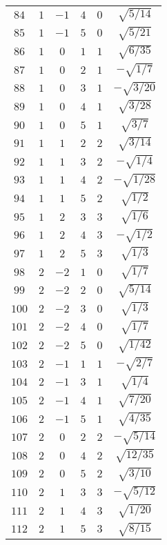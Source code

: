 \begin{table}
\begin{center}
\begin{tabular}{|c|c|c|c|c|c|}
$84$ & $1$ & $-1$ & $4$ & $0$ & $\sqrt{5/14}$ \\ 
$85$ & $1$ & $-1$ & $5$ & $0$ & $\sqrt{5/21}$ \\ 
$86$ & $1$ & $0$ & $1$ & $1$ & $\sqrt{6/35}$ \\ 
$87$ & $1$ & $0$ & $2$ & $1$ & $-\sqrt{1/7}$ \\ 
$88$ & $1$ & $0$ & $3$ & $1$ & $-\sqrt{3/20}$ \\ 
$89$ & $1$ & $0$ & $4$ & $1$ & $\sqrt{3/28}$ \\ 
$90$ & $1$ & $0$ & $5$ & $1$ & $\sqrt{3/7}$ \\ 
$91$ & $1$ & $1$ & $2$ & $2$ & $\sqrt{3/14}$ \\ 
$92$ & $1$ & $1$ & $3$ & $2$ & $-\sqrt{1/4}$ \\ 
$93$ & $1$ & $1$ & $4$ & $2$ & $-\sqrt{1/28}$ \\ 
$94$ & $1$ & $1$ & $5$ & $2$ & $\sqrt{1/2}$ \\ 
$95$ & $1$ & $2$ & $3$ & $3$ & $\sqrt{1/6}$ \\ 
$96$ & $1$ & $2$ & $4$ & $3$ & $-\sqrt{1/2}$ \\ 
$97$ & $1$ & $2$ & $5$ & $3$ & $\sqrt{1/3}$ \\ 
$98$ & $2$ & $-2$ & $1$ & $0$ & $\sqrt{1/7}$ \\ 
$99$ & $2$ & $-2$ & $2$ & $0$ & $\sqrt{5/14}$ \\ 
$100$ & $2$ & $-2$ & $3$ & $0$ & $\sqrt{1/3}$ \\ 
$101$ & $2$ & $-2$ & $4$ & $0$ & $\sqrt{1/7}$ \\ 
$102$ & $2$ & $-2$ & $5$ & $0$ & $\sqrt{1/42}$ \\ 
$103$ & $2$ & $-1$ & $1$ & $1$ & $-\sqrt{2/7}$ \\ 
$104$ & $2$ & $-1$ & $3$ & $1$ & $\sqrt{1/4}$ \\ 
$105$ & $2$ & $-1$ & $4$ & $1$ & $\sqrt{7/20}$ \\ 
$106$ & $2$ & $-1$ & $5$ & $1$ & $\sqrt{4/35}$ \\ 
$107$ & $2$ & $0$ & $2$ & $2$ & $-\sqrt{5/14}$ \\ 
$108$ & $2$ & $0$ & $4$ & $2$ & $\sqrt{12/35}$ \\ 
$109$ & $2$ & $0$ & $5$ & $2$ & $\sqrt{3/10}$ \\ 
$110$ & $2$ & $1$ & $3$ & $3$ & $-\sqrt{5/12}$ \\ 
$111$ & $2$ & $1$ & $4$ & $3$ & $\sqrt{1/20}$ \\ 
$112$ & $2$ & $1$ & $5$ & $3$ & $\sqrt{8/15}$ \\ 

\end{tabular}
\end{center}
\end{table}
